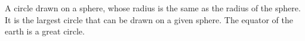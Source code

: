 A circle drawn on a sphere, whose radius is the same as the radius of
the sphere. It is the largest circle that can be drawn on a given sphere.
The equator of the earth is a great circle.